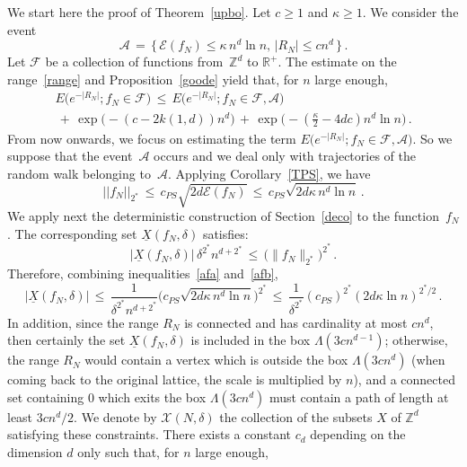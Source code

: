 \documentclass[10pt]{amsart}
\theoremstyle{definition}\newtheorem{defi}[theo]{Definition}\newtheorem{rema}[theo]{Remark}\newtheorem{exam}[theo]{Example}\newtheorem{exem}[theo]{Example}\newtheorem{nota}[theo]{Notation}
\newcommand{\XX}{{\underline{X}}}
\newcommand*\Zd {{\mathbb Z^d}}
\newcommand*\R{\mathbb{R}}
\newcommand*\La {{\Lambda}}
\newcommand{\cA}{\mathcal{A}}
\newcommand{\cE}{\mathcal{E}}
\newcommand{\cF}{\mathcal{F}}
\newcommand{\cX}{\mathcal{X}}
\begin{document}
We start here the proof of Theorem~\ref{upbo}. Let $c\geq 1$ and $\kappa\geq 1$. We consider the event
\begin{equation*}\label{defa}
\cA\,=\,\big\{\,
\cE(f_N)\leq\kappa \,n^d\ln n,\, |R_N|\leq cn^d\,\big\}\,.
\end{equation*}
Let $\cF$ be a collection of functions from~$\Zd$ to $\R^+$. The estimate on the range~\eqref{range} and Proposition~\ref{goode} yield that, for $n$ large enough,
\begin{multline}
E\big(e^{-|R_N|}; f_N\in\cF)\,\leq\, E\big(e^{-|R_N|}; f_N\in\cF,\cA)
\\
\,+\,
\exp\big(-(c-2k(1,d))n^d\big)\,+\,
\exp\Big(-\left(\frac{\kappa}{2}-4dc\right)n^d\ln n\Big)\,.\label{inisum}
\end{multline}
From now onwards, we focus on estimating the term $E\big(e^{-|R_N|}; f_N\in\cF,\cA)$. So we suppose that the event~$\cA$ occurs and we deal only with trajectories of the random walk belonging to~$\cA$. Applying Corollary~\ref{TPS}, we have
\begin{equation}\label{afa}
||f_N||_{2^*}
\,\leq\, c_{PS}
\sqrt{2d\cE(f_N)}\,\leq\, c_{PS}
\sqrt{2d\kappa \,n^d\ln n}
\,.
\end{equation}
We apply next the deterministic construction of Section~\ref{deco} to the function~$f_N$. The corresponding set $\XX(f_N,\delta)$ satisfies:
\begin{equation}\label{afb}
\big|\XX(f_N,\delta)\big|\,
\delta^{2^*} n^{d+2^*}
\,\leq\,
\big(\|f_N\|_{2^*}\big)^{2^*}\,.
\end{equation}
Therefore, combining inequalities~\eqref{afa} and~\eqref{afb},
\begin{equation}\label{cardx}
\big|\XX(f_N,\delta)\big|\,\leq\,
\frac{1}{ \delta^{2^*} n^{d+2^*} }
\Big(c_{PS}
\sqrt{2d\kappa \,n^d\ln n}\Big)^{2^*}\,\leq\,
\frac{1} { \delta^{2^*}} (c_{PS})^{2^*} (2d\kappa\ln n)^{2^*/2}
\,.
\end{equation}
In addition, since the range $R_N$ is connected and has cardinality at most $cn^d$, then certainly the set $\XX(f_N,\delta)$ is included in the box $\La(3cn^{d-1})$; otherwise, the range $R_N$ would contain a vertex which is outside the box $\La(3cn^d)$ (when coming back to the original lattice, the scale is multiplied by $n$), and a connected set containing $0$ which exits the box $\La(3cn^{d})$ must contain a path of length at least $3cn^{d}/2$. We denote by $\cX(N,\delta)$ the collection of the subsets $X$ of $\Zd$ satisfying these constraints. There exists a constant $c_d$ depending on the dimension $d$ only such that, for $n$ large enough,
\end{document}
